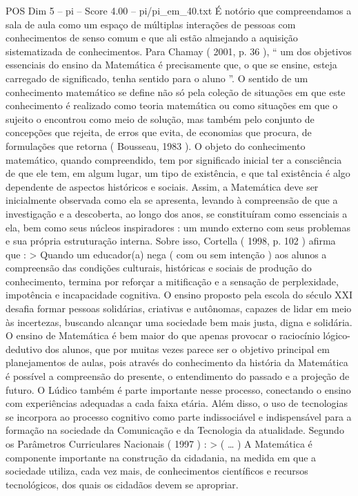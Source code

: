 \begin{textsample}{POS Dim 5 – pi – Score 4.00 – pi/pi\_em\_40.txt}
É notório que compreendamos a sala de aula como um espaço de múltiplas interações de pessoas com conhecimentos de senso comum e que ali estão almejando a aquisição sistematizada de conhecimentos.
Para Chamay ( 2001, p. 36 ), “ um dos objetivos essenciais do ensino da Matemática é precisamente que, o que se ensine, esteja carregado de significado, tenha sentido para o aluno ”.
O sentido de um conhecimento matemático se define não só pela coleção de situações em que este conhecimento é realizado como teoria matemática ou como situações em que o sujeito o encontrou como meio de solução, mas também pelo conjunto de concepções que rejeita, de erros que evita, de economias que procura, de formulações que retorna ( Bousseau, 1983 ).
O objeto do conhecimento matemático, quando compreendido, tem por significado inicial ter a consciência de que ele tem, em algum lugar, um tipo de existência, e que tal existência é algo dependente de aspectos históricos e sociais.
Assim, a Matemática deve ser inicialmente observada como ela se apresenta, levando à compreensão de que a investigação e a descoberta, ao longo dos anos, se constituíram como essenciais a ela, bem como seus núcleos inspiradores : um mundo externo com seus problemas e sua própria estruturação interna.
Sobre isso, Cortella ( 1998, p. 102 ) afirma que : > Quando um educador(a) nega ( com ou sem intenção ) aos alunos a compreensão das condições culturais, históricas e sociais de produção do conhecimento, termina por reforçar a mitificação e a sensação de perplexidade, impotência e incapacidade cognitiva.
O ensino proposto pela escola do século XXI desafia formar pessoas solidárias, criativas e autônomas, capazes de lidar em meio às incertezas, buscando alcançar uma sociedade bem mais justa, digna e solidária.
O ensino de Matemática é bem maior do que apenas provocar o raciocínio lógico-dedutivo dos alunos, que por muitas vezes parece ser o objetivo principal em planejamentos de aulas, pois através do conhecimento da história da Matemática é possível a compreensão do presente, o entendimento do passado e a projeção de futuro.
O Lúdico também é parte importante nesse processo, conectando o ensino com experiências adequadas a cada faixa etária.
Além disso, o uso de tecnologias se incorpora ao processo cognitivo como parte indissociável e indispensável para a formação na sociedade da Comunicação e da Tecnologia da atualidade.
Segundo os Parâmetros Curriculares Nacionais ( 1997 ) : > ( … ) A Matemática é componente importante na construção da cidadania, na medida em que a sociedade utiliza, cada vez mais, de conhecimentos científicos e recursos tecnológicos, dos quais os cidadãos devem se apropriar.

\end{textsample}
